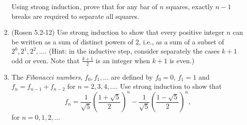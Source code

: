\begin{enumerate}
Using strong induction, prove that for any bar of $n$ squares, exactly $n-1$ breaks are required to separate all squares.

\item \strhard (Rosen 5.2-12) Use strong induction to show that every positive integer $n$ can be written as a sum of distinct powers of 2, i.e., as a sum of a subset of $2^0, 2^1, 2^2, \dots$. 
(Hint: in the inductive step, consider separately the cases $k+1$ odd or even. Note that $\frac{k+1}{2}$ is an integer when $k+1$ is even.)

\item \strmedium The \textit{Fibonacci numbers}, $f_{0},f_{1},\dots$ are defined by $f_{0}=0$, $f_{1}=1$ and $f_{n}=f_{n-1}+f_{n-2}$ for $n=2,3,4,\dots$. Use strong induction to show that
\begin{equation*}
f_n=\frac{1}{\sqrt{5}}\left(\frac{1+\sqrt{5}}{2}\right)^{n}
- \frac{1}{\sqrt{5}}\left(\frac{1-\sqrt{5}}{2}\right)^{n},
\end{equation*}
for $n=0,1,2,\dots$
\end{enumerate}


